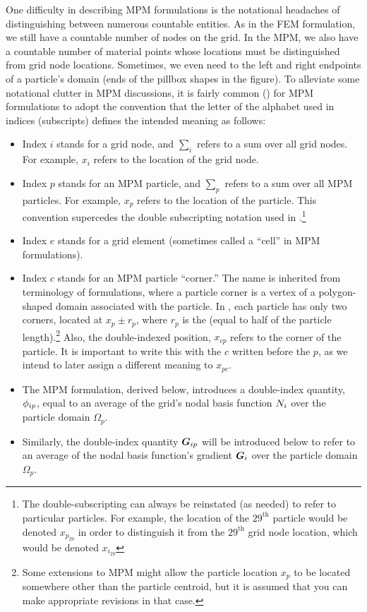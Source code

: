 One difficulty in describing MPM formulations is the notational headaches of distinguishing between numerous countable entities. As in the FEM formulation, we still have a countable number of nodes on the grid. In the MPM, we also have a countable number of material points whose locations must be distinguished from grid node locations. Sometimes, we even need to the left and right endpoints of a particle's domain (ends of the pillbox shapes in the figure). To alleviate some notational clutter in MPM discussions, it is fairly common (\cf \cite{Bardenhagen2004}) for MPM formulations to adopt the convention that the letter of the alphabet used in indices (subscripts) defines the intended meaning as follows:
\begin{itemize}
  \item Index $i$ stands for a grid node, and $\sum_i$ refers to a sum over all grid nodes. For example, $x_i$ refers to the location of the \ith grid node.
  \item Index $p$ stands for an MPM particle, and $\sum_p$ refers to a sum over all MPM particles.  For example, $x_p$ refers to the location of the \pth particle. This convention supercedes the double subscripting notation used in .\footnote{The double-subscripting can always be reinstated (as needed) to refer to particular particles. For example, the location of the $29^\text{th}$ particle would be denoted $x_{p_{29}}$ in order to distinguish it from the $29^\text{th}$ grid node location, which would be denoted $x_{i_{29}}$}
  \item Index $e$ stands for a grid element (sometimes called a ``cell'' in MPM formulations).
  \item Index $c$ stands for an MPM particle ``corner.''  The name  is inherited from terminology of \twoD formulations, where a particle corner is a vertex of a polygon-shaped domain associated with the particle. In \oneD, each particle has only two corners, located at $x_p\pm r_p$, where $r_p$ is the  (equal to half of the particle length).\footnote{Some extensions to MPM might allow the particle location $x_p$ to be located somewhere other than the particle centroid, but it is assumed that you can make appropriate revisions in that case.} Also, the double-indexed position, $x_{cp}$ refers to the \cth corner of the \pth particle.  It is important to write this with the $c$ written before the $p$, as we intend to later assign a different meaning to $x_{pc}$.
  \item The MPM formulation, derived below, introduces a double-index quantity, ${\phi_{ip}}$, equal to an average of the grid's \ith nodal basis function ${N}_i$ over the \pth particle domain $\Omega_p$.
  \item Similarly, the double-index quantity ${\bm{G}_{ip}}$ will be introduced below to refer to an average of the \ith nodal basis function's gradient $\bm{G}_i$ over the \pth particle domain $\Omega_p$.
\end{itemize}

